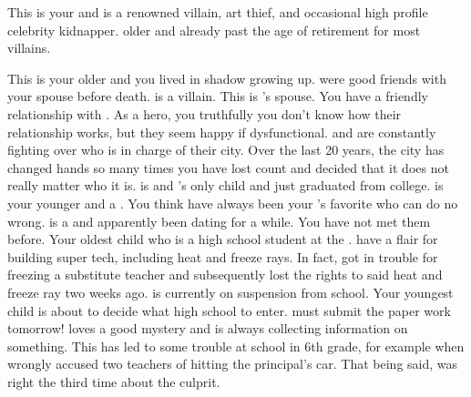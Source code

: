 \documentclass[char]{LRSguildcamp1}
\begin{document}
\begin{contacts}
	\contact{\cGrandma{}} This is your \cGrandma{\parent} and is a renowned villain, art thief, and occasional high profile celebrity kidnapper. \cGrandma{\Theyare} older and already past the age of retirement for most villains.
	
	\contact{\cOldest{}} This is your older \cOldest{\sibling} and you lived in \cOldest{\their} shadow growing up. \cOldest{\They} were good friends with your spouse before \cAS{\their} death. \cOldest{} is a villain. 
	\contact{\cOS{}} This is \cOldest{}'s spouse. You have a friendly relationship with \cOS{\them}. As a hero, you truthfully you don't know how their relationship works, but they seem happy if dysfunctional.  \cOldest{} and \cOS{} are constantly fighting over who is in charge of their city.  Over the last 20 years, the city has changed hands so many times you have lost count and decided that it does not really matter who it is. 
	\contact{\cGrad{}} \cGrad{} is \cOldest{} and \cOS{}'s only child and just graduated from college. 
	\contact{\cYoungest{}} \cYoungest{} is your younger \cYoungest{\sibling} and a \cYoungest{\hero}. You think  have always been your \cGrandma{\parent}'s favorite who can do no wrong. 
	\contact{\cYS{}} \cYS{} is a \cYS{\hero} and apparently been dating \cYoungest{} for a while. You have not met them before. 
	\contact{\cTeen{}} Your oldest child who is a high school student at the \pNormalSchool{}. \cTeen{\They} have a flair for building super tech, including heat and freeze rays. In fact, \cTeen{} got in trouble for freezing a substitute teacher and subsequently lost the rights to said heat and freeze ray two weeks ago. \cTeen{} is currently on suspension from school.
	\contact{\cTween{}} Your youngest child is about to decide what high school to enter. \cTween{} must submit the paper work tomorrow! \cTween{} loves a good mystery and is always collecting information on something. This has led to some trouble at school in 6th grade, for example when \cTween{\they} wrongly accused two teachers of hitting the principal's car. That being said, \cTween{\they} was right the third time about the culprit.
\end{contacts}
\end{document}

